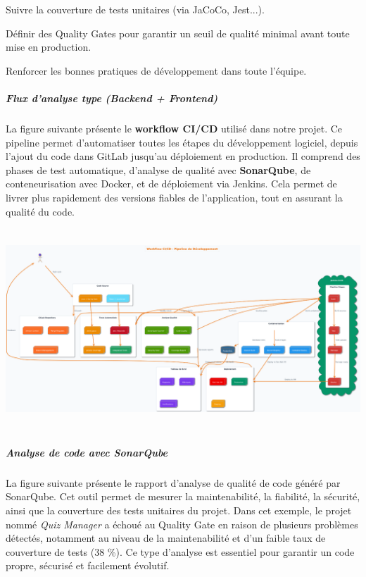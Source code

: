 \documentclass[12pt,a4paper,twoside,openright]{report}
\begin{document}
Suivre la couverture de tests unitaires (via JaCoCo, Jest...).

Définir des Quality Gates pour garantir un seuil de qualité minimal
avant toute mise en production.

Renforcer les bonnes pratiques de développement dans toute l'équipe.

\hypertarget{flux-danalyse-type-backend-frontend}{%
\subparagraph{Flux d'analyse type (Backend +
Frontend)}\label{flux-danalyse-type-backend-frontend}}

La figure suivante présente le \textbf{workflow CI/CD} utilisé dans
notre projet. Ce pipeline permet d'automatiser toutes les étapes du
développement logiciel, depuis l'ajout du code dans GitLab jusqu'au
déploiement en production. Il comprend des phases de test automatique,
d'analyse de qualité avec \textbf{SonarQube}, de conteneurisation avec
Docker, et de déploiement via Jenkins. Cela permet de livrer plus
rapidement des versions fiables de l'application, tout en assurant la
qualité du code.

\includegraphics[width=6.29921in,height=2.96457in]{latex_media/media/image42.png}

\hypertarget{analyse-de-code-avec-sonarqube}{%
\subparagraph{Analyse de code avec
SonarQube}\label{analyse-de-code-avec-sonarqube}}

La figure suivante présente le rapport d'analyse de qualité de code
généré par SonarQube. Cet outil permet de mesurer la maintenabilité, la
fiabilité, la sécurité, ainsi que la couverture des tests unitaires du
projet. Dans cet exemple, le projet nommé \emph{Quiz Manager} a échoué
au Quality Gate en raison de plusieurs problèmes détectés, notamment au
niveau de la maintenabilité et d'un faible taux de couverture de tests
(38 \%). Ce type d'analyse est essentiel pour garantir un code propre,
sécurisé et facilement évolutif.
\end{document}
